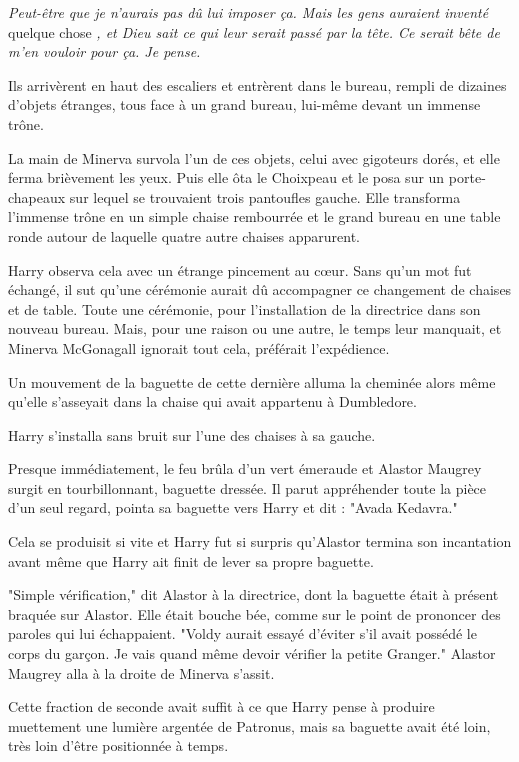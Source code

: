 \emph{Peut-être que je n'aurais pas dû lui imposer ça. Mais les gens auraient inventé}  quelque chose \emph{, et Dieu sait ce qui leur serait passé par la tête. Ce serait bête de m'en vouloir pour ça. Je pense.} 

Ils arrivèrent en haut des escaliers et entrèrent dans le bureau, rempli de dizaines d'objets étranges, tous face à un grand bureau, lui-même devant un immense trône.

La main de Minerva survola l'un de ces objets, celui avec gigoteurs dorés, et elle ferma brièvement les yeux. Puis elle ôta le Choixpeau et le posa sur un porte-chapeaux sur lequel se trouvaient trois pantoufles gauche. Elle transforma l'immense trône en un simple chaise rembourrée et le grand bureau en une table ronde autour de laquelle quatre autre chaises apparurent.

Harry observa cela avec un étrange pincement au cœur. Sans qu'un mot fut échangé, il sut qu'une cérémonie aurait dû accompagner ce changement de chaises et de table. Toute une cérémonie, pour l'installation de la directrice dans son nouveau bureau. Mais, pour une raison ou une autre, le temps leur manquait, et Minerva McGonagall ignorait tout cela, préférait l'expédience.

Un mouvement de la baguette de cette dernière alluma la cheminée alors même qu'elle s'asseyait dans la chaise qui avait appartenu à Dumbledore.

Harry s'installa sans bruit sur l'une des chaises à sa gauche.

Presque immédiatement, le feu brûla d'un vert émeraude et Alastor Maugrey surgit en tourbillonnant, baguette dressée. Il parut appréhender toute la pièce d'un seul regard, pointa sa baguette vers Harry et dit : "Avada Kedavra."

Cela se produisit si vite et Harry fut si surpris qu'Alastor termina son incantation avant même que Harry ait finit de lever sa propre baguette.

"Simple vérification," dit Alastor à la directrice, dont la baguette était à présent braquée sur Alastor. Elle était bouche bée, comme sur le point de prononcer des paroles qui lui échappaient. "Voldy aurait essayé d'éviter s'il avait possédé le corps du garçon. Je vais quand même devoir vérifier la petite Granger." Alastor Maugrey alla à la droite de Minerva s'assit.

Cette fraction de seconde avait suffit à ce que Harry pense à produire muettement une lumière argentée de Patronus, mais sa baguette avait été loin, très loin d'être positionnée à temps.

